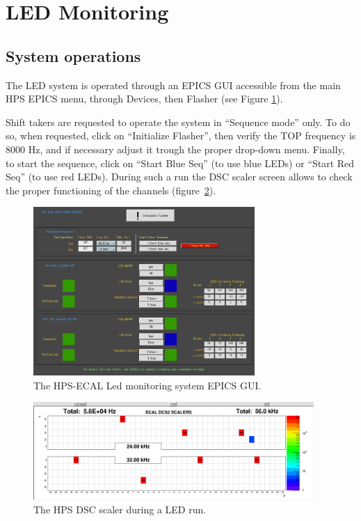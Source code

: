 \documentclass[12pt]{article}
\begin{document}
   \section{LED Monitoring}

      \subsection{System operations}
      
      The LED system is operated through an EPICS GUI accessible from the main HPS EPICS menu, through Devices, then Flasher (see Figure \ref{FlasherMEDM}).

Shift takers are requested to operate the system in ``Sequence mode'' only. To do so, when requested, click on ``Initialize Flasher'', then verify the TOP frequency is 8000 Hz, and if necessary adjust it trough the proper drop-down menu. Finally, to start the sequence, click on ``Start Blue Seq'' (to use blue LEDs) or ``Start Red Seq'' (to use red LEDs). During such a run the DSC scaler screen allows to check the proper functioning of the channels (figure~\ref{LEDScalers}). 

\begin{figure}[htbp]
\center
\includegraphics[width=0.75\textwidth]{pics/FlasherMEDM.png}
\caption{\small \label{FlasherMEDM} The HPS-ECAL Led monitoring system EPICS GUI.}
\end{figure}
\begin{figure}[htbp]
\center
\includegraphics[width=0.95\textwidth]{pics/DSCScalersLED_2014_12_20.png}
\caption{\small \label{LEDScalers} The HPS DSC scaler during a LED run.}
\end{figure}
\newpage
\end{document}
